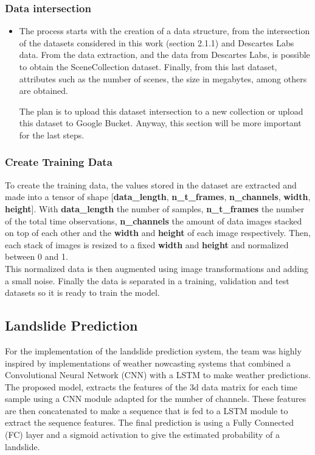 \documentclass[sigconf, nonacm]{acmart}
\begin{document}
\subsubsection{Data intersection}
\begin{itemize}
    \item The process starts with the creation of a data structure, from the intersection of the datasets considered in this work (section 2.1.1) and Descartes Labs data. From the data extraction, and the data from Descartes Labs, is possible to obtain the SceneCollection dataset. Finally, from this last dataset, attributes such as the number of scenes, the size in megabytes, among others are obtained.

    The plan is to upload this dataset intersection to a new collection or upload this dataset to Google Bucket. Anyway, this section will be more important for the last steps.
\end{itemize}

\subsubsection{Create Training Data} 

\noindent

To create the training data, the values stored in the dataset are extracted and made into a tensor of shape [\textbf{data\_length}, \textbf{n\_t\_frames}, \textbf{n\_channels}, \textbf{width}, \textbf{height}]. With \textbf{data\_length} the number of samples, \textbf{n\_t\_frames} the number of the total time observations, \textbf{n\_channels} the amount of data images stacked on top of each other and the \textbf{width} and \textbf{height} of each image respectively. Then, each stack of images is resized to a fixed \textbf{width} and \textbf{height} and normalized between 0 and 1.\\
This normalized data is then augmented using image transformations and adding a small noise. Finally the data is separated in a training, validation and test datasets so it is ready to train the model.



\subsection{Landslide Prediction}

For the implementation of the landslide prediction system, the team was highly inspired by implementations of weather nowcasting systems \cite{Forecast_LSTM} that combined a Convolutional Neural Network (CNN) with a LSTM \cite{LSTM} to make weather predictions. %
The proposed model, extracts the features of the 3d data matrix for each time sample using a CNN module adapted for the number of channels. These features are then concatenated to make a sequence that is fed to a LSTM module to extract the sequence features. The final prediction is using a Fully Connected (FC) layer and a sigmoid activation to give the estimated probability of a landslide. 
\end{document}
